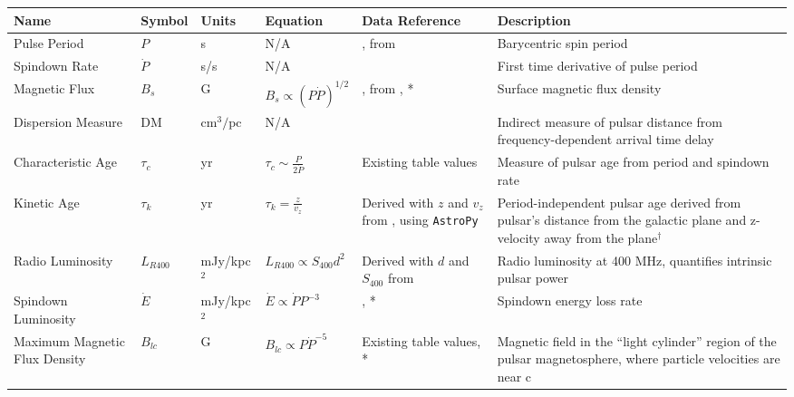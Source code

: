 \documentclass[fleqn,usenatbib]{mnras}
\begin{document}
\begin{table*} 
    \centering
    \begin{tabular}{p{2.75cm}p{1cm}p{1cm}p{2cm}p{3cm}p{3cm}}
        \hline
        Name & Symbol & Units & Equation & Data Reference & Description  \\
        \hline
        
        Pulse Period & $P$ & s & N/A & \citet{Konar2019}, from \citet{Manchester_2005} & Barycentric spin period \\
        
        Spindown Rate & $\Dot{P}$ & s/s & N/A & \citet{Manchester_2005} & First time derivative of pulse period \\
        
        Magnetic Flux & $B_s$ & G & $B_s \propto (P \Dot{P})^{1/2}$ & \citet{Konar2019}, from \citet{Manchester_2005}, \citet{ostriker1969nature}* & Surface magnetic flux density \\
        
        Dispersion Measure & DM & cm$^3/$pc & N/A & \citet{Manchester_2005} & Indirect measure of pulsar distance from frequency-dependent arrival time delay \citep[e.g., ][]{jokipii1969faraday} \\
        
        Characteristic Age & $\tau_c$ & yr & $\tau_c \sim \frac{P}{2\Dot{P}}$ & Existing table values & Measure of pulsar age from period and spindown rate \\
        
        Kinetic Age & $\tau_k$ & yr & $\tau_k = \frac{z}{v_{z}}$ & Derived with $z$ and $v_{z}$ from \citet{Manchester_2005}, using \texttt{AstroPy} \citep{robitaille2013astropy} & Period-independent pulsar age derived from pulsar's distance from the galactic plane and z-velocity away from the plane$^\dagger$\\
        
        Radio Luminosity & $L_{R400}$ & mJy/kpc$^2$ & $L_{R400} \propto S_{400} d^2$ & Derived with $d$ and $S_{400}$ from \citet{Manchester_2005} & Radio luminosity at 400 MHz, quantifies intrinsic pulsar power\\
        
        Spindown Luminosity & $\Dot{E}$ & mJy/kpc$^2$ & $\Dot{E} \propto \Dot{P}P^{-3}$ & \citet{Manchester_2005}, \citet{gold1969rotating}* & Spindown energy loss rate\\
        
        Maximum Magnetic Flux Density & $B_{lc}$ & G & $B_{lc} \propto P\Dot{P}^{-5}$ & Existing table values, \citet{goldreich1969physics, lyne1975period}* & Magnetic field in the ``light cylinder'' region of the pulsar magnetosphere, where particle velocities are near c\\
        

\end{tabular}
\end{table*}
\end{document}
